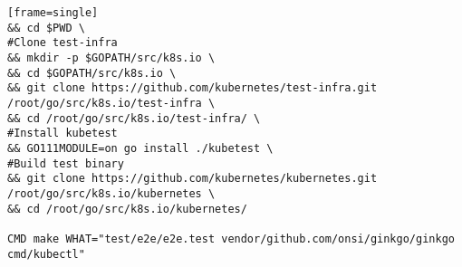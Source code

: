 \begin{verbatim}[frame=single]
&& cd $PWD \
#Clone test-infra
&& mkdir -p $GOPATH/src/k8s.io \
&& cd $GOPATH/src/k8s.io \
&& git clone https://github.com/kubernetes/test-infra.git 
/root/go/src/k8s.io/test-infra \
&& cd /root/go/src/k8s.io/test-infra/ \
#Install kubetest
&& GO111MODULE=on go install ./kubetest \
#Build test binary
&& git clone https://github.com/kubernetes/kubernetes.git 
/root/go/src/k8s.io/kubernetes \
&& cd /root/go/src/k8s.io/kubernetes/
 
CMD make WHAT="test/e2e/e2e.test vendor/github.com/onsi/ginkgo/ginkgo cmd/kubectl"
\end{verbatim}

\Blindtext
